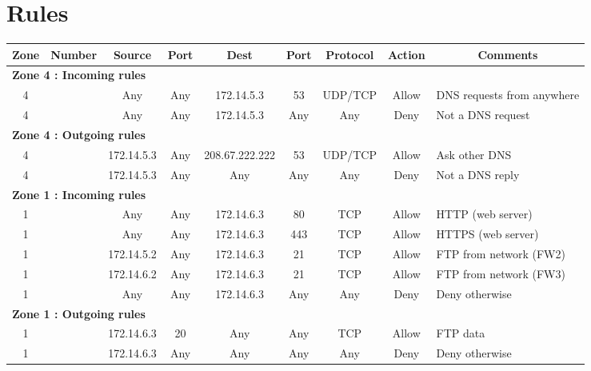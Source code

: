 \documentclass[a4paper,titlepage]{article}
\begin{document}
\section{Rules}
\label{sec:Rules}

\begin{landscape}
	\vspace*{\fill}
	\begin{table}[h]
		\center
		\begin{tabular}{c|c|cc|cc|ccl}
			Zone & Number & Source & Port & Dest & Port & Protocol & Action & \multicolumn{1}{c}{Comments}\\

			\hline
			\multicolumn{9}{l}{\textbf{Zone 4 : Incoming rules}}\\
			4 &  & Any & Any & 172.14.5.3 & 53 & UDP/TCP & Allow & DNS requests from anywhere\\
			4 &  & Any & Any & 172.14.5.3 & Any & Any & Deny & Not a DNS request\\

			\hline
			\multicolumn{9}{l}{\textbf{Zone 4 : Outgoing rules}}\\
			4 &  & 172.14.5.3 & Any & 208.67.222.222 & 53 & UDP/TCP & Allow & Ask other DNS\\
			4 &  & 172.14.5.3 & Any & Any & Any & Any & Deny & Not a DNS reply\\

			\hline
			\multicolumn{9}{l}{\textbf{Zone 1 : Incoming rules}}\\
			1 &  & Any & Any & 172.14.6.3 & 80 & TCP & Allow & HTTP (web server)\\
			1 &  & Any & Any & 172.14.6.3 & 443 & TCP & Allow & HTTPS (web server)\\
			1 &  & 172.14.5.2 & Any & 172.14.6.3 & 21 & TCP & Allow & FTP from network (FW2)\\
			1 &  & 172.14.6.2 & Any & 172.14.6.3 & 21 & TCP & Allow & FTP from network (FW3)\\
			1 &  & Any & Any & 172.14.6.3 & Any & Any & Deny & Deny otherwise\\

			\hline 
			\multicolumn{9}{l}{\textbf{Zone 1 : Outgoing rules}}\\
			1 &  & 172.14.6.3 & 20 & Any & Any & TCP & Allow & FTP data\\
			1 &  & 172.14.6.3 & Any & Any & Any & Any & Deny & Deny otherwise\\


\end{tabular}
\end{table}
\end{landscape}
\end{document}
